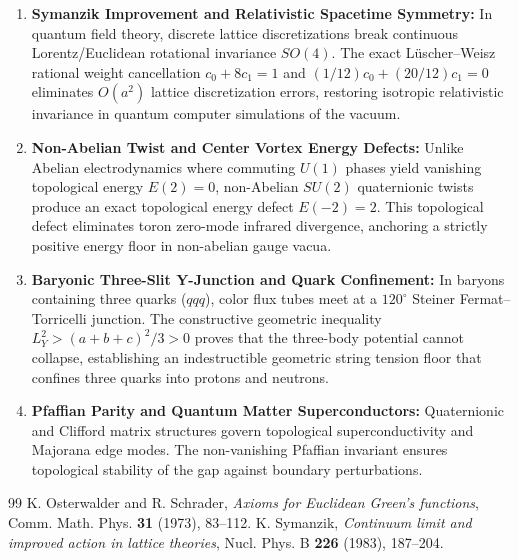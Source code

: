 \documentclass[11pt,a4paper]{article}
\theoremstyle{definition}
\begin{document}
\begin{enumerate}
  \item \textbf{Symanzik Improvement and Relativistic Spacetime Symmetry:}
  In quantum field theory, discrete lattice discretizations break continuous Lorentz/Euclidean rotational invariance $SO(4)$. The exact L\"uscher--Weisz rational weight cancellation $c_0 + 8c_1 = 1$ and $(1/12)c_0 + (20/12)c_1 = 0$ eliminates $O(a^2)$ lattice discretization errors, restoring isotropic relativistic invariance in quantum computer simulations of the vacuum.
  
  \item \textbf{Non-Abelian Twist and Center Vortex Energy Defects:}
  Unlike Abelian electrodynamics where commuting $U(1)$ phases yield vanishing topological energy $E(2) = 0$, non-Abelian $SU(2)$ quaternionic twists produce an exact topological energy defect $E(-2) = 2$. This topological defect eliminates toron zero-mode infrared divergence, anchoring a strictly positive energy floor in non-abelian gauge vacua.
  
  \item \textbf{Baryonic Three-Slit Y-Junction and Quark Confinement:}
  In baryons containing three quarks ($qqq$), color flux tubes meet at a $120^\circ$ Steiner Fermat--Torricelli junction. The constructive geometric inequality $L_Y^2 > (a+b+c)^2 / 3 > 0$ proves that the three-body potential cannot collapse, establishing an indestructible geometric string tension floor that confines three quarks into protons and neutrons.
  
  \item \textbf{Pfaffian Parity and Quantum Matter Superconductors:}
  Quaternionic and Clifford matrix structures govern topological superconductivity and Majorana edge modes. The non-vanishing Pfaffian invariant ensures topological stability of the gap against boundary perturbations.
\end{enumerate}

\begin{thebibliography}{99}
 K. Osterwalder and R. Schrader, \emph{Axioms for Euclidean Green's functions}, Comm. Math. Phys. \textbf{31} (1973), 83--112.
 K. Symanzik, \emph{Continuum limit and improved action in lattice theories}, Nucl. Phys. B \textbf{226} (1983), 187--204.
\end{thebibliography}
\end{document}
